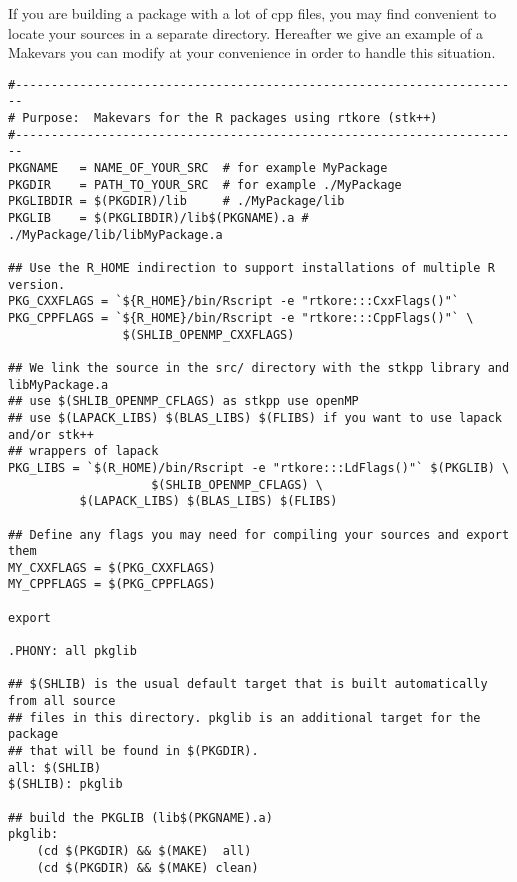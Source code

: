 \documentclass[a4paper,10pt]{article}
\begin{document}
If you are building a package with a lot of cpp files, you may find
convenient to locate your sources in a separate directory. Hereafter we give an
example of a Makevars you can modify at your convenience in order to handle
this situation.
\begin{verbatim}
#-----------------------------------------------------------------------
# Purpose:  Makevars for the R packages using rtkore (stk++)
#-----------------------------------------------------------------------
PKGNAME   = NAME_OF_YOUR_SRC  # for example MyPackage
PKGDIR    = PATH_TO_YOUR_SRC  # for example ./MyPackage
PKGLIBDIR = $(PKGDIR)/lib     # ./MyPackage/lib
PKGLIB    = $(PKGLIBDIR)/lib$(PKGNAME).a # ./MyPackage/lib/libMyPackage.a

## Use the R_HOME indirection to support installations of multiple R version.
PKG_CXXFLAGS = `${R_HOME}/bin/Rscript -e "rtkore:::CxxFlags()"`
PKG_CPPFLAGS = `${R_HOME}/bin/Rscript -e "rtkore:::CppFlags()"` \
                $(SHLIB_OPENMP_CXXFLAGS)

## We link the source in the src/ directory with the stkpp library and libMyPackage.a
## use $(SHLIB_OPENMP_CFLAGS) as stkpp use openMP
## use $(LAPACK_LIBS) $(BLAS_LIBS) $(FLIBS) if you want to use lapack and/or stk++
## wrappers of lapack
PKG_LIBS = `$(R_HOME)/bin/Rscript -e "rtkore:::LdFlags()"` $(PKGLIB) \
					$(SHLIB_OPENMP_CFLAGS) \
          $(LAPACK_LIBS) $(BLAS_LIBS) $(FLIBS)

## Define any flags you may need for compiling your sources and export them
MY_CXXFLAGS = $(PKG_CXXFLAGS)
MY_CPPFLAGS = $(PKG_CPPFLAGS)

export

.PHONY: all pkglib

## $(SHLIB) is the usual default target that is built automatically from all source
## files in this directory. pkglib is an additional target for the package
## that will be found in $(PKGDIR).
all: $(SHLIB)
$(SHLIB): pkglib

## build the PKGLIB (lib$(PKGNAME).a)
pkglib:
	(cd $(PKGDIR) && $(MAKE)  all)
	(cd $(PKGDIR) && $(MAKE) clean)
\end{verbatim}



\end{document}
